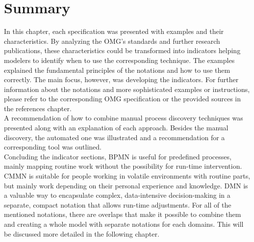 \section{Summary}
In this chapter, each specification was presented with examples and their characteristics. By analyzing the OMG's standards and further research publications, these characteristics could be transformed into indicators helping modelers to identify when to use the corresponding technique. The examples explained the fundamental principles of the notations and how to use them correctly. The main focus, however, was developing the indicators. For further information about the notations and more sophisticated examples or instructions, please refer to the corresponding OMG specification or the provided sources in the references chapter. \\
A recommendation of how to combine manual process discovery techniques was presented along with an explanation of each approach. Besides the manual discovery, the automated one was illustrated and a recommendation for a corresponding tool was outlined. \\
Concluding the indicator sections, BPMN is useful for predefined processes, mainly mapping routine work without the possibility for run-time intervention. CMMN is suitable for people working in volatile environments with routine parts, but mainly work depending on their personal experience and knowledge. DMN is a valuable way to encapsulate complex, data-intensive decision-making in a separate, compact notation that allows run-time adjustments. For all of the mentioned notations, there are overlaps that make it possible to combine them and creating a whole model with separate notations for each domains. This will be discussed more detailed in the following chapter.